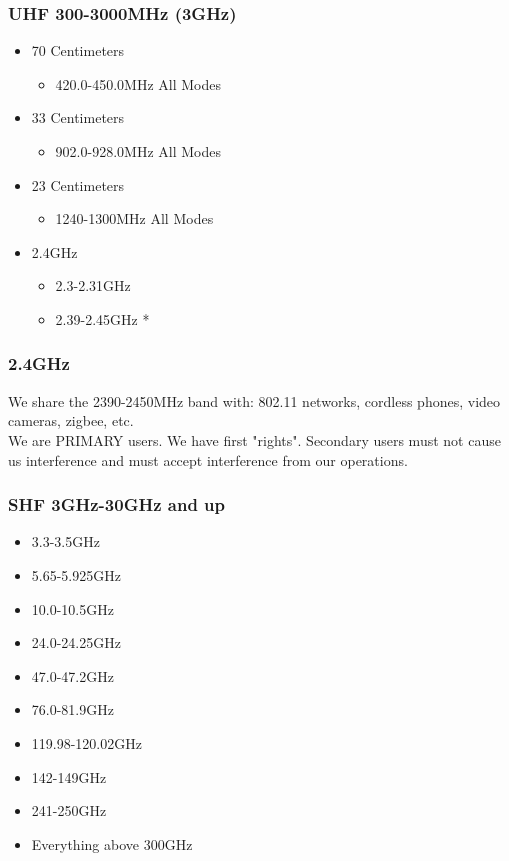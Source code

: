 \documentclass[10pt]{beamer}
\begin{document}
\begin{frame}
\frametitle{UHF 300-3000MHz (3GHz)}
\begin{itemize}
\item 70 Centimeters
\begin{itemize}
\item 420.0-450.0MHz All Modes
\end{itemize}
\item 33 Centimeters
\begin{itemize}
\item 902.0-928.0MHz All Modes
\end{itemize}
\item 23 Centimeters
\begin{itemize}
\item 1240-1300MHz All Modes
\end{itemize}
\item 2.4GHz
\begin{itemize}
\item 2.3-2.31GHz
\item 2.39-2.45GHz *
\end{itemize}
\end{itemize}
\end{frame}

\begin{frame}
\frametitle{2.4GHz}
We share the 2390-2450MHz band with: 802.11 networks, cordless phones, video cameras, zigbee, etc.\ \\
We are PRIMARY users. We have first "rights". Secondary users must not cause us interference and must accept interference from our operations.
\end{frame}

\begin{frame}
\frametitle{SHF 3GHz-30GHz and up}
\begin{itemize}
\item 3.3-3.5GHz
\item  5.65-5.925GHz
\item  10.0-10.5GHz
\item  24.0-24.25GHz
\item  47.0-47.2GHz
\item  76.0-81.9GHz
\item  119.98-120.02GHz
\item  142-149GHz
\item  241-250GHz
\item  Everything above 300GHz
\end{itemize}
\end{frame}
\end{document}
